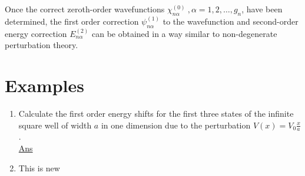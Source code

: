 		Once the correct zeroth-order wavefunctions $\chi_{n\alpha}^{(0)}\ , \alpha=1,2, \ldots, g_n$, have been determined, the first order correction $\psi_{n \alpha}^{(1)}$ to the wavefunction and second-order energy correction $E_{n\alpha}^{(2)}$ can be obtained in a way similar to non-degenerate perturbation theory.
		
		
		
		\section{Examples}
		\begin{enumerate}
			\item 
			Calculate the first order energy shifts for the first three states of the infinite square well of width $a$ in one dimension due to the perturbation $V(x) = V_0 \frac{x}{a}$.\\
			
			\underline{Ans}\\
			
			
			
			\item 
			This is new
			
			
			
			
		\end{enumerate}
	
	


